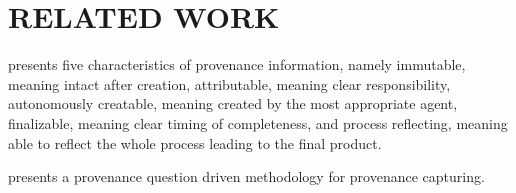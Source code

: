  
\chapter{RELATED WORK}

\cite{groth2009recording} presents five characteristics of provenance information, namely immutable, meaning intact after creation, attributable, meaning clear responsibility, autonomously creatable, meaning created by the most appropriate agent, finalizable, meaning clear timing of completeness, and process reflecting, meaning able to reflect the whole process leading to the final product.

\cite{miles2011prime} presents a provenance question driven methodology for provenance capturing.

